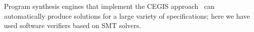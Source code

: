 \documentclass[runningheads]{llncs}
\begin{document}
Program synthesis engines that implement the CEGIS approach~\cite{sketch} can automatically produce solutions for a large variety of specifications; %
here we have used software verifiers based on SMT solvers.%
%
\end{document}

